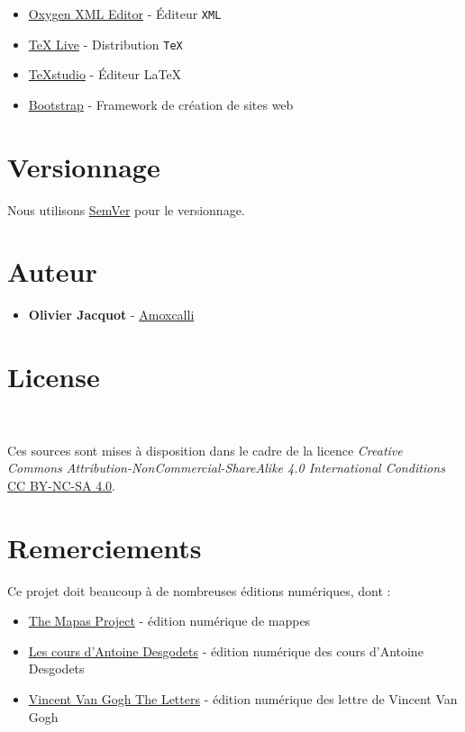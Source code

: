 \documentclass[a4paper,twoside,12pt]{article}
\begin{document}
\begin{itemize}
	\item
	\href{https://www.oxygenxml.com/}{Oxygen XML Editor} - \'Editeur \texttt{XML}
	\item
	\href{http://www.tug.org/texlive/}{TeX Live} - Distribution \texttt{TeX}
	\item
	\href{https://www.texstudio.org/}{TeXstudio} - \'Editeur \LaTeX
	\item
	\href{https://getbootstrap.com/}{Bootstrap} - Framework de cr\'eation de sites web
\end{itemize}

\section{Versionnage}

Nous utilisons \href{http://semver.org/}{SemVer} pour le versionnage.

\section{Auteur}

\begin{itemize}
	\item
	\textbf{Olivier Jacquot} -
	\href{https://github.com/olivierjacquot}{Amoxcalli}
\end{itemize}

\section{License}\

Ces sources sont mises \`a disposition dans le cadre de la licence \emph{Creative Commons Attribution-NonCommercial-ShareAlike 4.0 International Conditions}
\href{https://creativecommons.org/licenses/by-nc-sa/4.0/deed.fr}{CC BY-NC-SA 4.0}.

\section{Remerciements}

Ce projet doit beaucoup \`a de nombreuses \'editions num\'eriques, dont :

\begin{itemize}
	\item \href{https://mapas.uoregon.edu/}{The Mapas Project} - \'edition
	num\'erique de mappes
	\item \href{http://www.desgodets.net/}{Les cours d'Antoine Desgodets} -
	\'edition num\'erique des cours d'Antoine Desgodets
	\item \href{http://vangoghletters.org}{Vincent Van Gogh The Letters} -
	\'edition num\'erique des lettre de Vincent Van Gogh
\end{itemize}
\end{document}
